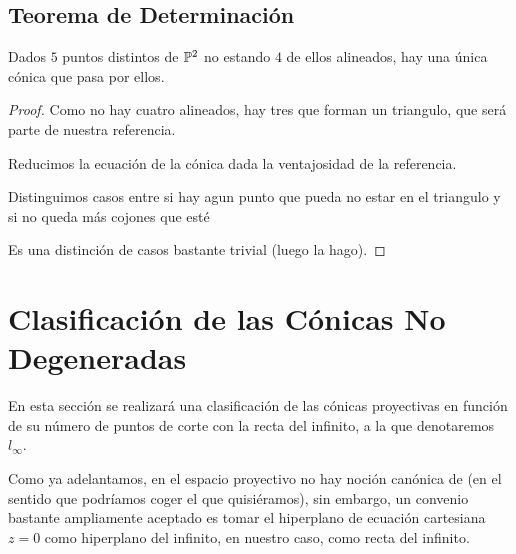 \subsection{Teorema de Determinación}
\begin{theo}
	Dados $5$ puntos distintos de $\mathbb{P}^2$ no estando $4$ de ellos alineados, hay una única cónica que pasa por ellos.
\end{theo}
\begin{proof}
	Como no hay cuatro alineados, hay tres que forman un triangulo, que será parte de nuestra referencia.
	
	Reducimos la ecuación de la cónica dada la ventajosidad de la referencia.
	
	Distinguimos casos entre si hay agun punto que pueda no estar en el triangulo y si no queda más cojones que esté
	
	Es una distinción de casos bastante trivial (luego la hago).
\end{proof}
\section{Clasificación de las Cónicas No Degeneradas}
En esta sección se realizará una clasificación de las cónicas proyectivas en función de su número de puntos de corte con la recta del infinito, a la que denotaremos $l_\infty$.

Como ya adelantamos, en el espacio proyectivo no hay noción canónica de  (en el sentido que podríamos coger el que quisiéramos), sin embargo, un convenio bastante ampliamente aceptado es tomar el hiperplano de ecuación cartesiana $z=0$ como hiperplano del infinito, en nuestro caso, como recta del infinito.

